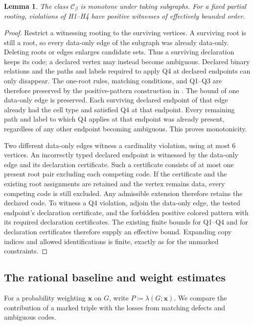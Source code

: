\documentclass[10pt]{article}
\numberwithin{equation}{section}
\newtheorem{lemma}[lemma]{Lemma}\aliascntresetthe{lemma}
\theoremstyle{definition}
\newcommand{\x}{\boldsymbol{x}}\newcommand{\y}{\boldsymbol{y}}
\begin{document}
\begin{lemma}
\label{lem:ternary-marker-monotone}
The class $\mathcal C_\beta$ is monotone under taking subgraphs. For a fixed partial rooting, violations of H1--H4 have positive witnesses of effectively bounded order.
\end{lemma}
\begin{proof}
Restrict a witnessing rooting to the surviving vertices. A surviving root is still a root, so every data-only edge of the subgraph was already data-only. Deleting roots or edges enlarges candidate sets. Thus a surviving declaration keeps its code; a declared vertex may instead become ambiguous. Declared binary relations and the paths and labels required to apply Q4 at declared endpoints can only disappear. The one-root rules, matching conditions, and Q1--Q3 are therefore preserved by the positive-pattern construction in . The bound of one data-only edge is preserved. Each surviving declared endpoint of that edge already had the cell type and satisfied Q4 at that endpoint. Every remaining path and label to which Q4 applies at that endpoint was already present, regardless of any other endpoint becoming ambiguous. This proves monotonicity.

Two different data-only edges witness a cardinality violation, using at most 6 vertices. An incorrectly typed declared endpoint is witnessed by the data-only edge and its declaration certificate. Such a certificate consists of at most one present root pair excluding each competing code. If the certificate and the existing root assignments are retained and the vertex remains data, every competing code is still excluded. Any admissible extension therefore retains the declared code. To witness a Q4 violation, adjoin the data-only edge, the tested endpoint's declaration certificate, and the forbidden positive colored pattern with its required declaration certificates. The existing finite bounds for Q1--Q4 and for declaration certificates therefore supply an effective bound. Expanding copy indices and allowed identifications is finite, exactly as for the unmarked constraints.
\end{proof}
\subsection{The rational baseline and weight estimates}\label{sec:numerical-weighted}
For a probability weighting $\x$ on $G$, write $P\coloneqq\lambda(G;\x)$. We compare the contribution of a marked triple with the losses from matching defects and ambiguous codes.
\end{document}
